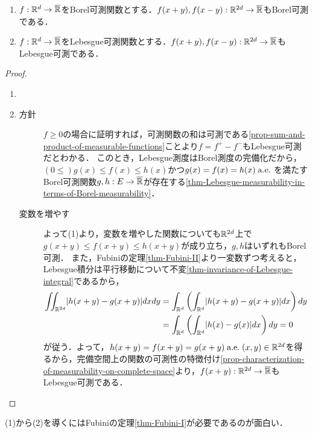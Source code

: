 \documentclass[uplatex, dvipdfmx]{jsreport}
\begin{document}
\begin{proposition}[Lebesgue可測関数の平行移動]\label{prop-pararell-shift-of-Lebesgue-measurable-function}\mbox{}
    \begin{enumerate}
        \item $f:\mathbb{R}^d\to\overline{\mathbb{R}}$をBorel可測関数とする．$f(x+y),f(x-y):\mathbb{R}^{2d}\to\overline{\mathbb{R}}$もBorel可測である．
        \item $f:\mathbb{R}^d\to\overline{\mathbb{R}}$をLebesgue可測関数とする．$f(x+y),f(x-y):\mathbb{R}^{2d}\to\overline{\mathbb{R}}$もLebesgue可測である．
    \end{enumerate}
\end{proposition}
\begin{proof}\mbox{}
    \begin{enumerate}
        \item 
        \item 
        \begin{description}
            \item[方針] $f\ge 0$の場合に証明すれば，可測関数の和は可測である\ref{prop-sum-and-product-of-measurable-functions}ことより$f=f^+-f^-$もLebesgue可測だとわかる．
            このとき，Lebesgue測度はBorel測度の完備化だから，$(0\le)g(x)\le f(x)\le h(x)$かつ$g(x)=f(x)=h(x)\;\mathrm{a.e.}\;$を満たすBorel可測関数$g,h:E\to\overline{\mathbb{R}}$が存在する\ref{thm-Lebesgue-measurability-in-terms-of-Borel-measurability}．
            \item[変数を増やす]
            よって(1)より，変数を増やした関数についても$\mathbb{R}^{2d}$上で$g(x+y)\le f(x+y)\le h(x+y)$が成り立ち，$g,h$はいずれもBorel可測．
            また，Fubiniの定理\ref{thm-Fubini-II}より一変数ずつ考えると，Lebesgue積分は平行移動について不変\ref{thm-invariance-of-Lebesgue-integral}であるから，
            \begin{align*}
                \iint_{\mathbb{R}^{2d}}\lvert h(x+y)-g(x+y)\rvert dxdy&=\int_{\mathbb{R}^d}\left(\int_{\mathbb{R}^d}\lvert h(x+y)-g(x+y)\rvert dx\right)dy\\
                &=\int_{\mathbb{R}^d}\left(\int_{\mathbb{R}^d}\lvert h(x)-g(x)\rvert dx\right)dy=0
            \end{align*}
            が従う．よって，$h(x+y)=f(x+y)=g(x+y)\;\mathrm{a.e.}\; (x,y)\in\mathbb{R}^{2d}$を得るから，完備空間上の関数の可測性の特徴付け\ref{prop-characterization-of-measurability-on-complete-space}より，$f(x+y):\mathbb{R}^{2d}\to\overline{\mathbb{R}}$もLebesgue可測である．
        \end{description}
    \end{enumerate}
\end{proof}
\begin{remarks}
    (1)から(2)を導くにはFubiniの定理\ref{thm-Fubini-I}が必要であるのが面白い．
\end{remarks}
\end{document}
